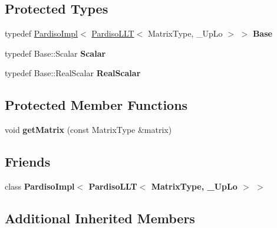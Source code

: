 \subsection*{Protected Types}
\begin{DoxyCompactItemize}
\item 
\mbox{\label{class_eigen_1_1_pardiso_l_l_t_a2db30d3b0a2bc5836ca565cd5352483b}} 
typedef \mbox{\hyperlink{class_eigen_1_1_pardiso_impl}{Pardiso\+Impl}}$<$ \mbox{\hyperlink{class_eigen_1_1_pardiso_l_l_t}{Pardiso\+L\+LT}}$<$ Matrix\+Type, \+\_\+\+Up\+Lo $>$ $>$ {\bfseries Base}
\item 
\mbox{\label{class_eigen_1_1_pardiso_l_l_t_af01f78d498ca862dc922e85308a9fb99}} 
typedef Base\+::\+Scalar {\bfseries Scalar}
\item 
\mbox{\label{class_eigen_1_1_pardiso_l_l_t_ae1d2fdefc5f542214f6c374b1037e020}} 
typedef Base\+::\+Real\+Scalar {\bfseries Real\+Scalar}
\end{DoxyCompactItemize}
\subsection*{Protected Member Functions}
\begin{DoxyCompactItemize}
\item 
\mbox{\label{class_eigen_1_1_pardiso_l_l_t_abf6ad5867c951f4ce0f407a7c6e9d560}} 
void {\bfseries get\+Matrix} (const Matrix\+Type \&matrix)
\end{DoxyCompactItemize}
\subsection*{Friends}
\begin{DoxyCompactItemize}
\item 
\mbox{\label{class_eigen_1_1_pardiso_l_l_t_a076fbf53339403d9aa5cce02673f0abe}} 
class {\bfseries Pardiso\+Impl$<$ Pardiso\+L\+L\+T$<$ Matrix\+Type, \+\_\+\+Up\+Lo $>$ $>$}
\end{DoxyCompactItemize}
\subsection*{Additional Inherited Members}


